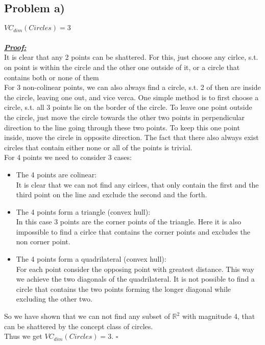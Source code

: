 \subsection*{Problem a)}
$VC_{dim}(Circles) = 3$\\
\\
\textbf{\underline{\textit{Proof:}}}\\
It is clear that any 2 points can be shattered. For this, just choose any cirlce, s.t. on point is within the circle and the other one outside of it, or a circle that contains both or none of them\\
For 3 non-colinear points, we can also always find a circle, s.t. 2 of then are inside the circle, leaving one out, and vice verca. One simple method is to first choose a circle, s.t. all 3 points lie on the border of the circle. 
To leave one point outside the circle, just move the circle towards the other two points in perpendicular direction to the line going through these two points. To keep this one point inside, move the circle in opposite direction.
The fact that there also always exist circles that contain either none or all of the points is trivial.\\
For 4 points we need to consider 3 cases:
\begin{itemize}
\item The 4 points are colinear:\\
It is clear that we can not find any cirlces, that only contain the first and the third point on the line and exclude the second and the forth.
\item The 4 points form a triangle (convex hull):\\
In this case 3 points are the corner points of the triangle. Here it is also impossible to find a cirlce that contains the corner points and excludes the non corner point.
\item The 4 points form a quadrilateral (convex hull):\\
For each point consider the opposing point with greatest distance. This way we achieve the two diagonals of the quadrilateral.
It is not possible to find a circle that contains the two points forming the longer diagonal while excluding the other two.
\end{itemize}
So we have shown that we can not find any subset of $\mathbb{R}^2$ with magnitude 4, that can be shattered by the concept class of circles.\\
Thus we get $VC_{dim}(Circles) = 3$.
\hfill$\square$


